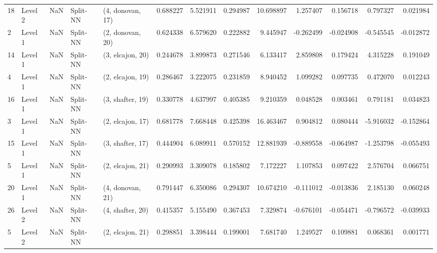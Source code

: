 \begin{tabular}{llrllrrrrrrrr}
18 &   Level 2 &    NaN &       Split-NN &  (4, donovan, 17) &   0.688227 &   5.521911 &  0.294987 &  10.698897 &             1.257407 &               0.156718 &            0.797327 &              0.021984 \\
2  &   Level 1 &    NaN &       Split-NN &  (2, donovan, 20) &   0.624338 &   6.579620 &  0.222882 &   9.445947 &            -0.262499 &              -0.024908 &           -0.545545 &             -0.012872 \\
14 &   Level 1 &    NaN &       Split-NN &  (3, elcajon, 20) &   0.244678 &   3.899873 &  0.271546 &   6.133417 &             2.859808 &               0.179424 &            4.315228 &              0.191049 \\
4  &   Level 1 &    NaN &       Split-NN &  (2, elcajon, 19) &   0.286467 &   3.222075 &  0.231859 &   8.940452 &             1.099282 &               0.097735 &            0.472070 &              0.012243 \\
16 &   Level 1 &    NaN &       Split-NN &  (3, shafter, 19) &   0.330778 &   4.637997 &  0.405385 &   9.210359 &             0.048528 &               0.003461 &            0.791181 &              0.034823 \\
3  &   Level 1 &    NaN &       Split-NN &  (2, elcajon, 17) &   0.681778 &   7.668448 &  0.425398 &  16.463467 &             0.904812 &               0.080444 &           -5.916032 &             -0.152864 \\
15 &   Level 1 &    NaN &       Split-NN &  (3, shafter, 17) &   0.444904 &   6.089911 &  0.570152 &  12.881939 &            -0.889558 &              -0.064987 &           -1.253798 &             -0.055493 \\
5  &   Level 1 &    NaN &       Split-NN &  (2, elcajon, 21) &   0.290993 &   3.309078 &  0.185802 &   7.172227 &             1.107853 &               0.097422 &            2.576704 &              0.066751 \\
20 &   Level 1 &    NaN &       Split-NN &  (4, donovan, 21) &   0.791447 &   6.350086 &  0.294307 &  10.674210 &            -0.111012 &              -0.013836 &            2.185130 &              0.060248 \\
26 &   Level 2 &    NaN &       Split-NN &  (4, shafter, 20) &   0.415357 &   5.155490 &  0.367453 &   7.329874 &            -0.676101 &              -0.054471 &           -0.796572 &             -0.039933 \\
5  &   Level 2 &    NaN &       Split-NN &  (2, elcajon, 21) &   0.298851 &   3.398444 &  0.199001 &   7.681740 &             1.249527 &               0.109881 &            0.068361 &              0.001771 \\

\end{tabular}
